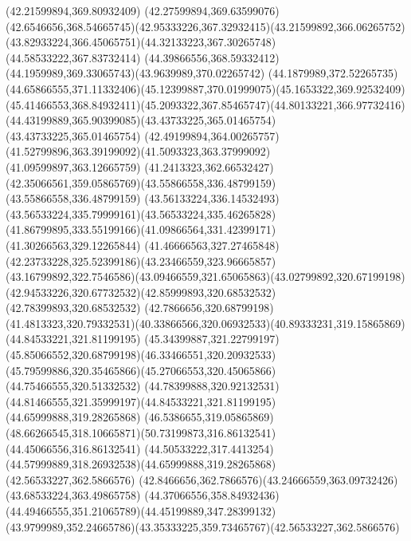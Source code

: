 {{	\lineto(42.21599894,369.80932409)
	\lineto(42.27599894,369.63599076)
	\curveto(42.6546656,368.54665745)(42.95333226,367.32932415)(43.21599892,366.06265752)
	\curveto(43.82933224,366.45065751)(44.32133223,367.30265748)(44.58533222,367.83732414)
	\curveto(44.39866556,368.59332412)(44.1959989,369.33065743)(43.9639989,370.02265742)
	\lineto(44.1879989,372.52265735)
	\curveto(44.65866555,371.11332406)(45.12399887,370.01999075)(45.1653322,369.92532409)
	\curveto(45.41466553,368.84932411)(45.2093322,367.85465747)(44.80133221,366.97732416)
	\curveto(44.43199889,365.90399085)(43.43733225,365.01465754)(43.43733225,365.01465754)
	\curveto(42.49199894,364.00265757)(41.52799896,363.39199092)(41.5093323,363.37999092)
	\lineto(41.09599897,363.12665759)
	\lineto(41.2413323,362.66532427)
	\curveto(42.35066561,359.05865769)(43.55866558,336.48799159)(43.55866558,336.48799159)
	\curveto(43.56133224,336.14532493)(43.56533224,335.79999161)(43.56533224,335.46265828)
	\curveto(41.86799895,333.55199166)(41.09866564,331.42399171)(41.30266563,329.12265844)
	\curveto(41.46666563,327.27465848)(42.23733228,325.52399186)(43.23466559,323.96665857)
	\curveto(43.16799892,322.7546586)(43.09466559,321.65065863)(43.02799892,320.67199198)
	\curveto(42.94533226,320.67732532)(42.85999893,320.68532532)(42.78399893,320.68532532)
	\lineto(42.7866656,320.68799198)
	\curveto(41.4813323,320.79332531)(40.33866566,320.06932533)(40.89333231,319.15865869)
	\moveto(44.84533221,321.81199195)
	\curveto(45.34399887,321.22799197)(45.85066552,320.68799198)(46.33466551,320.20932533)
	\curveto(45.79599886,320.35465866)(45.27066553,320.45065866)(44.75466555,320.51332532)
	\curveto(44.78399888,320.92132531)(44.81466555,321.35999197)(44.84533221,321.81199195)
	\moveto(44.65999888,319.28265868)
	\curveto(46.5386655,319.05865869)(48.66266545,318.10665871)(50.73199873,316.86132541)
	\lineto(44.45066556,316.86132541)
	\curveto(44.50533222,317.4413254)(44.57999889,318.26932538)(44.65999888,319.28265868)
	\moveto(42.56533227,362.5866576)
	\curveto(42.8466656,362.7866576)(43.24666559,363.09732426)(43.68533224,363.49865758)
	\curveto(44.37066556,358.84932436)(44.49466555,351.21065789)(44.45199889,347.28399132)
	\curveto(43.9799989,352.24665786)(43.35333225,359.73465767)(42.56533227,362.5866576)
}
}
